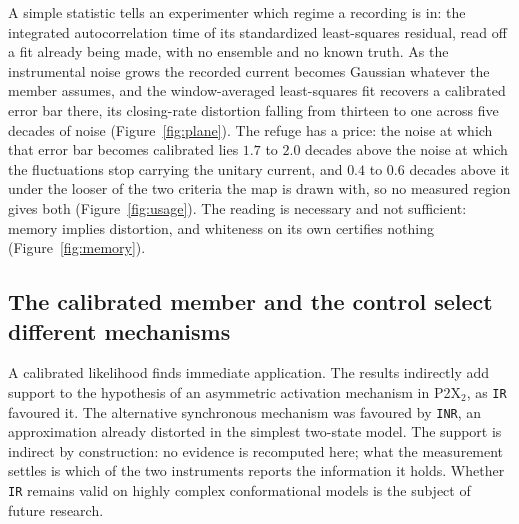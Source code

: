A simple statistic tells an experimenter which regime a recording is in: the integrated autocorrelation time of its standardized least-squares residual, read off a fit already being made, with no ensemble and no known truth. As the instrumental noise grows the recorded current becomes Gaussian whatever the member assumes, and the window-averaged least-squares fit recovers a calibrated error bar there, its closing-rate distortion falling from thirteen to one across five decades of noise (Figure~\ref{fig:plane}). The refuge has a price: the noise at which that error bar becomes calibrated lies $1.7$ to $2.0$ decades above the noise at which the fluctuations stop carrying the unitary current, and $0.4$ to $0.6$ decades above it under the looser of the two criteria the map is drawn with, so no measured region gives both (Figure~\ref{fig:usage}). The reading is necessary and not sufficient: memory implies distortion, and whiteness on its own certifies nothing (Figure~\ref{fig:memory}).

\subsection*{The calibrated member and the control select different mechanisms}

A calibrated likelihood finds immediate application. The results indirectly add support to the hypothesis of an asymmetric activation mechanism in P2X$_2$, as \texttt{IR} favoured it. The alternative synchronous mechanism was favoured by \texttt{INR}, an approximation already distorted in the simplest two-state model. The support is indirect by construction: no evidence is recomputed here; what the measurement settles is which of the two instruments reports the information it holds. Whether \texttt{IR} remains valid on highly complex conformational models is the subject of future research.

